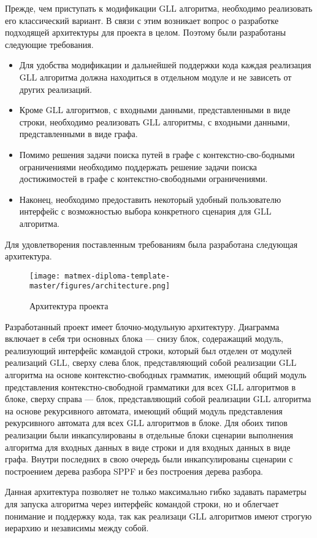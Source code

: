 Прежде, чем приступать к модификации GLL алгоритма, необходимо реализовать его классический вариант.
В связи с этим возникает вопрос о разработке подходящей архитектуры для проекта в целом.
Поэтому были разработаны следующие требования.
\begin{itemize}
    \item Для удобства модификации и дальнейшей поддержки кода каждая реализация GLL алгоритма должна находиться в отдельном модуле и не зависеть от других реализаций.
    \item Кроме GLL алгоритмов, с входными данными, представленными в виде строки, необходимо реализовать GLL алгоритмы, с входными данными, представленными в виде графа.
    \item Помимо решения задачи поиска путей в графе с контекстно-сво-бодными ограничениями необходимо поддержать решение задачи поиска достижимостей в графе с контекстно-свободными ограничениями.
    \item Наконец, необходимо предоставить некоторый удобный пользователю интерфейс с возможностью выбора конкретного сценария для GLL алгоритма.
\end{itemize}
Для удовлетворения поставленным требованиям была разработана следующая архитектура.

\begin{figure}[H]
    \centering
    \texttt{[image: matmex-diploma-template-master/figures/architecture.png]}
    \caption{Архитектура проекта}
    \label{fig:architecture}
\end{figure}

Разработанный проект имеет блочно-модульную архитектуру.
Диаграмма включает в себя три основных блока --- снизу блок, содеражащий модуль, реализующий интерфейс командой строки, который был отделен от модулей реализаций GLL, сверху слева блок, представляющий собой реализации GLL алгоритма на основе контекстно-свободных грамматик, имеющий общий модуль представления контекстно-свободной грамматики для всех GLL алгоритмов в блоке, сверху справа --- блок, представляющий собой реализации GLL алгоритма на основе рекурсивного автомата, имеющий общий модуль представления рекурсивного автомата для всех GLL алгоритмов в блоке.
Для обоих типов реализации были инкапсулированы в отдельные блоки сценарии выполнения алгоритма для входных данных в виде строки и для входных данных в виде графа.
Внутри последних в свою очередь были инкапсулированы сценарии с построением дерева разбора SPPF и без построения дерева разбора.

Данная архитектура позволяет не только максимально гибко задавать параметры для запуска алгоритма через интерфейс командой строки, но и облегчает понимание и поддержку кода, так как реализаци GLL алгоритмов имеют строгую иерархию и независимы между собой. 